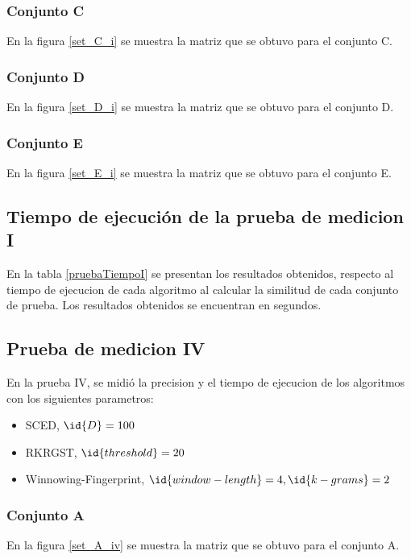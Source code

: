 \subsubsection{Conjunto C}
En la figura \ref{set_C_i} se muestra la matriz que se obtuvo para el conjunto C.


\subsubsection{Conjunto D}
En la figura \ref{set_D_i} se muestra la matriz que se obtuvo para el conjunto D.


\subsubsection{Conjunto E}
En la figura \ref{set_E_i} se muestra la matriz que se obtuvo para el conjunto E.



\subsection{Tiempo de ejecución de la prueba de medicion I}
En la tabla \ref{pruebaTiempoI} se presentan los resultados obtenidos, respecto al tiempo de ejecucion de cada algoritmo al calcular la similitud de cada conjunto de prueba. Los resultados obtenidos se encuentran en segundos.



\subsection{Prueba de medicion IV}
En la prueba IV, se midió la precision y el tiempo de ejecucion de los algoritmos con los siguientes parametros:
\begin{itemize}
  \item SCED, $\id{D} = 100$
  \item RKRGST, $\id{threshold} = 20$
  \item Winnowing-Fingerprint, $\id{window-length} = 4, \id{k-grams} = 2$
\end{itemize}

\subsubsection{Conjunto A}
En la figura \ref{set_A_iv} se muestra la matriz que se obtuvo para el conjunto A.


